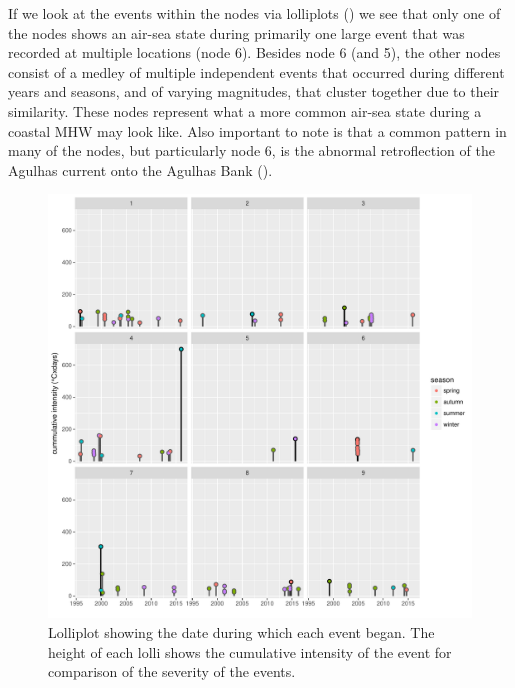 \documentclass[a4paper,10pt,review]{elsarticle}
\begin{document}
If we look at the events within the nodes via lolliplots () we see that only one of the nodes shows an air-sea state during primarily one large event that was recorded at multiple locations (node 6). Besides node 6 (and 5), the other nodes consist of a medley of multiple independent events that occurred during different years and seasons, and of varying magnitudes, that cluster together due to their similarity. These nodes represent what a more common air-sea state during a coastal MHW may look like. Also important to note is that a common pattern in many of the nodes, but particularly node 6, is the abnormal retroflection of the Agulhas current onto the Agulhas Bank ().

\begin{figure}
\includegraphics[width=1.0\textwidth]{figure_5.pdf}
\caption{Lolliplot showing the date during which each event began. The height of each lolli shows the cumulative intensity of the event for comparison of the severity of the events.}
\label{figure5}
\end{figure}
\end{document}
